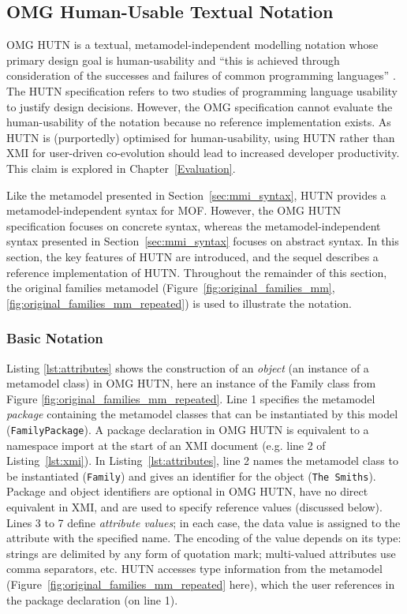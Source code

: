 \subsection{OMG Human-Usable Textual Notation}
\label{subsec:hutn}
OMG HUTN is a textual, metamodel-independent modelling notation whose primary design goal is human-usability and ``this is achieved through consideration of the successes and failures of common programming languages'' \cite[Section 2.2]{hutn}. The HUTN specification refers to two studies of programming language usability to justify design decisions. However, the OMG specification cannot evaluate the human-usability of the notation because no reference implementation exists. As HUTN is (purportedly) optimised for human-usability, using HUTN rather than XMI for user-driven co-evolution should lead to increased developer productivity. This claim is explored in Chapter~\ref{Evaluation}.

Like the metamodel presented in Section~\ref{sec:mmi_syntax}, HUTN provides a metamodel-independent syntax for MOF. However, the OMG HUTN specification focuses on concrete syntax, whereas the metamodel-independent syntax presented in Section~\ref{sec:mmi_syntax} focuses on abstract syntax. In this section, the key features of HUTN are introduced, and the sequel describes a reference implementation of HUTN. Throughout the remainder of this section, the original families metamodel (Figure~\ref{fig:original_families_mm}, \ref{fig:original_families_mm_repeated}) is used to illustrate the notation.


\subsubsection{Basic Notation}
Listing \ref{lst:attributes} shows the construction of an \emph{object} (an instance of a metamodel class) in OMG HUTN, here an instance of the Family class from Figure \ref{fig:original_families_mm_repeated}. Line 1 specifies the metamodel \emph{package} containing the metamodel classes that can be instantiated by this model (\texttt{Fa\-mi\-lyPa\-ck\-a\-ge}). A package declaration in OMG HUTN is equivalent to a namespace import at the start of an XMI document (e.g. line 2 of Listing~\ref{lst:xmi}). In Listing~\ref{lst:attributes}, line 2 names the metamodel class to be instantiated (\texttt{Fa\-mi\-ly}) and gives an identifier for the object (\texttt{The Sm\-it\-hs}). Package and object identifiers are optional in OMG HUTN, have no direct equivalent in XMI, and are used to specify reference values (discussed below). Lines 3 to 7 define \emph{attribute values}; in each case, the data value is assigned to the attribute with the specified name. The encoding of the value depends on its type: strings are delimited by any form of quotation mark; multi-valued attributes use comma separators, etc. HUTN accesses type information from the metamodel (Figure~\ref{fig:original_families_mm_repeated} here), which the user references in the package declaration (on line 1).

